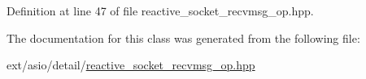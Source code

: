 Definition at line 47 of file reactive\+\_\+socket\+\_\+recvmsg\+\_\+op.\+hpp.



The documentation for this class was generated from the following file\+:\begin{DoxyCompactItemize}
\item 
ext/asio/detail/\hyperlink{reactive__socket__recvmsg__op_8hpp}{reactive\+\_\+socket\+\_\+recvmsg\+\_\+op.\+hpp}\end{DoxyCompactItemize}
